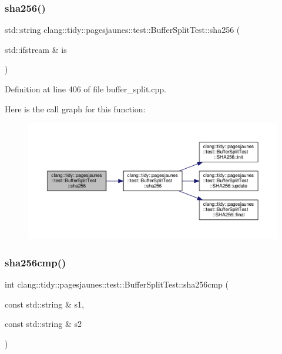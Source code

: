 \subsubsection{\texorpdfstring{sha256()}{sha256()}\hspace{0.1cm}{\footnotesize\ttfamily [2/2]}}
{\footnotesize\ttfamily std\+::string clang\+::tidy\+::pagesjaunes\+::test\+::\+Buffer\+Split\+Test\+::sha256 (\begin{DoxyParamCaption}\item[{std\+::ifstream \&}]{is }\end{DoxyParamCaption})}



Definition at line 406 of file buffer\+\_\+split.\+cpp.

Here is the call graph for this function\+:
\nopagebreak
\begin{figure}[H]
\begin{center}
\leavevmode
\includegraphics[width=350pt]{classclang_1_1tidy_1_1pagesjaunes_1_1test_1_1_buffer_split_test_a6b7813358946f66b4ea5f149651c6e44_cgraph}
\end{center}
\end{figure}
\mbox{\label{classclang_1_1tidy_1_1pagesjaunes_1_1test_1_1_buffer_split_test_a612d7a65fbe19e0f35c51eb6a68832ae}} 
\subsubsection{\texorpdfstring{sha256cmp()}{sha256cmp()}\hspace{0.1cm}{\footnotesize\ttfamily [1/2]}}
{\footnotesize\ttfamily int clang\+::tidy\+::pagesjaunes\+::test\+::\+Buffer\+Split\+Test\+::sha256cmp (\begin{DoxyParamCaption}\item[{const std\+::string \&}]{s1,  }\item[{const std\+::string \&}]{s2 }\end{DoxyParamCaption})}



